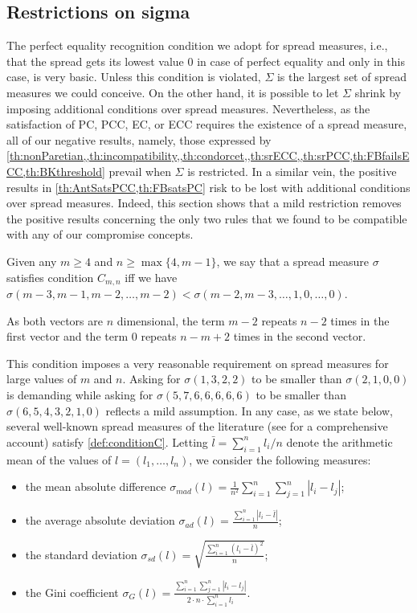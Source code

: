 \subsection{Restrictions on sigma}
\label{sec:RestrictionOnSigma}
The perfect equality recognition condition we adopt for spread measures, i.e., that the spread gets its lowest value $0$ in case of perfect equality and only in this case, is very basic. Unless this condition is violated, $\Sigma$ is the largest set of spread measures we could conceive. On the other hand, it is possible to let $\Sigma$ shrink by imposing additional conditions over spread measures. Nevertheless, as the satisfaction of \ac{PC}, \ac{PCC}, \ac{EC}, or \ac{ECC} requires the existence of a spread measure, all of our negative results, namely, those expressed by \cref{th:nonParetian,,th:incompatibility,,th:condorcet,,th:srECC,,th:srPCC,th:FBfailsECC,th:BKthreshold} prevail when $\Sigma$ is restricted. In a similar vein, the positive results in \cref{th:AntSatsPCC,th:FBsatsPC} risk to be lost with additional conditions over spread measures.
Indeed, this section shows that a mild restriction removes the positive results concerning the only two rules that we found to be compatible with any of our compromise concepts.

\begin{definition}
	\label{def:conditionC}
	Given any $m\geq4$ and $n\geq \max\{4,m-1\}$, we say that a spread measure $\sigma$ satisfies condition $C_{m,n}$ iff we have $\sigma(m-3, m-1, m-2, \dots, m-2) < \sigma(m-2, m-3, \dots, 1, 0, \dots, 0)$.
\end{definition}

As both vectors are $n$ dimensional, the term $m-2$ repeats $n-2$ times in the first vector and the term $0$ repeats $n-m+2$ times in the second vector.

This condition imposes a very reasonable requirement on spread measures for large values of $m$ and $n$. Asking for $\sigma(1,3,2,2)$ to be smaller than $\sigma(2,1,0,0)$ is demanding while asking for $\sigma(5,7,6,6,6,6,6)$ to be smaller than $\sigma(6,5,4,3,2,1,0)$ reflects a mild assumption. In any case, as we state below, several well-known spread measures of the literature (see \citet{Allison1978} for a comprehensive account) satisfy \cref{def:conditionC}. Letting $\bar{l} = \sum_{i=1}^{n} l_i / n$ denote the arithmetic mean of the values of $l = (l_1, …, l_n)$, we consider the following measures:

\begin{itemize}
	\item the mean absolute difference $\sigma_{mad}(l)= \frac{1}{n^2} \sum_{i=1}^{n}\sum_{j=1}^{n}|l_i-l_j|$;
	\item the average absolute deviation $\sigma_{ad}(l)= \frac{\sum_{i=1}^{n}|l_i-\bar{l}|}{n}$;
	\item the standard deviation $\sigma_{sd}(l)= \sqrt{\frac{\sum_{i=1}^{n}(l_i-\bar{l})^2}{n}}$;
	\item the Gini coefficient $\sigma_{G}(l)= \frac{\sum_{i=1}^{n}\sum_{j=1}^{n}|l_i-l_j|}{2 \cdot n \cdot \sum_{i=1}^{n} l_i}$.
\end{itemize} 

